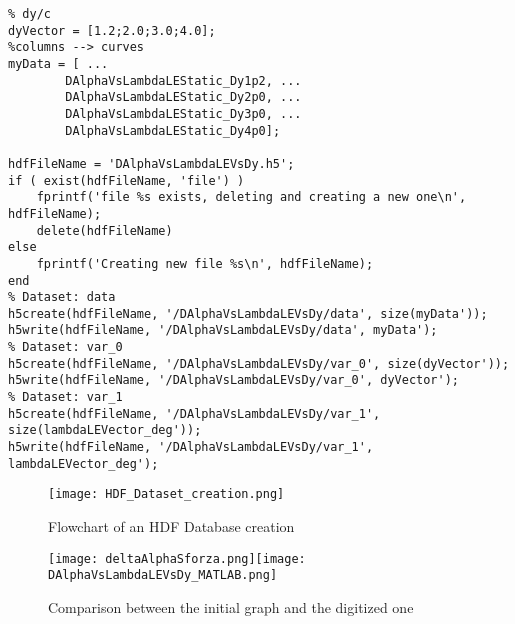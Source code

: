 \begin{lstlisting}[caption={MATLAB script for creating the HDF Database}, captionpos=b, tabsize=2]
%% preparing output to HDF
% dy/c
dyVector = [1.2;2.0;3.0;4.0];
%columns --> curves
myData = [ ...
        DAlphaVsLambdaLEStatic_Dy1p2, ...
        DAlphaVsLambdaLEStatic_Dy2p0, ...
        DAlphaVsLambdaLEStatic_Dy3p0, ... 
        DAlphaVsLambdaLEStatic_Dy4p0];   

hdfFileName = 'DAlphaVsLambdaLEVsDy.h5';
if ( exist(hdfFileName, 'file') )
    fprintf('file %s exists, deleting and creating a new one\n', hdfFileName);
    delete(hdfFileName)
else
    fprintf('Creating new file %s\n', hdfFileName);
end
% Dataset: data
h5create(hdfFileName, '/DAlphaVsLambdaLEVsDy/data', size(myData'));
h5write(hdfFileName, '/DAlphaVsLambdaLEVsDy/data', myData');
% Dataset: var_0
h5create(hdfFileName, '/DAlphaVsLambdaLEVsDy/var_0', size(dyVector'));
h5write(hdfFileName, '/DAlphaVsLambdaLEVsDy/var_0', dyVector');
% Dataset: var_1
h5create(hdfFileName, '/DAlphaVsLambdaLEVsDy/var_1', size(lambdaLEVector_deg'));
h5write(hdfFileName, '/DAlphaVsLambdaLEVsDy/var_1', lambdaLEVector_deg');
\end{lstlisting}

\bigskip
\begin{figure}[!hb]
\centering
\texttt{[image: HDF\_Dataset\_creation.png]}
\caption{Flowchart of an HDF Database creation}
\end{figure}
%
\clearpage
\begin{figure}
\centering
\texttt{[image: deltaAlphaSforza.png]}\texttt{[image: DAlphaVsLambdaLEVsDy\_MATLAB.png]}
\caption{Comparison between the initial graph and the digitized one}
\label{fig:DeltaAlphaMaxClean}
\end{figure}
%
